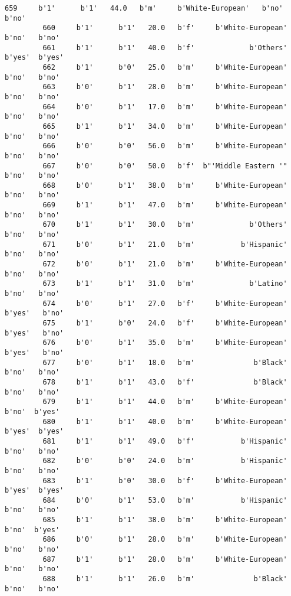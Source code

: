 \documentclass[11pt]{article}
\begin{document}
\begin{Verbatim}[commandchars=\\\{\}]
         659     b'1'      b'1'   44.0   b'm'     b'White-European'   b'no'   b'no'   
         660     b'1'      b'1'   20.0   b'f'     b'White-European'   b'no'   b'no'   
         661     b'1'      b'1'   40.0   b'f'             b'Others'  b'yes'  b'yes'   
         662     b'1'      b'0'   25.0   b'm'     b'White-European'   b'no'   b'no'   
         663     b'0'      b'1'   28.0   b'm'     b'White-European'   b'no'   b'no'   
         664     b'0'      b'1'   17.0   b'm'     b'White-European'   b'no'   b'no'   
         665     b'1'      b'1'   34.0   b'm'     b'White-European'   b'no'   b'no'   
         666     b'0'      b'0'   56.0   b'm'     b'White-European'   b'no'   b'no'   
         667     b'0'      b'0'   50.0   b'f'  b"'Middle Eastern '"   b'no'   b'no'   
         668     b'0'      b'1'   38.0   b'm'     b'White-European'   b'no'   b'no'   
         669     b'1'      b'1'   47.0   b'm'     b'White-European'   b'no'   b'no'   
         670     b'1'      b'1'   30.0   b'm'             b'Others'   b'no'   b'no'   
         671     b'0'      b'1'   21.0   b'm'           b'Hispanic'   b'no'   b'no'   
         672     b'0'      b'1'   21.0   b'm'     b'White-European'   b'no'   b'no'   
         673     b'1'      b'1'   31.0   b'm'             b'Latino'   b'no'   b'no'   
         674     b'0'      b'1'   27.0   b'f'     b'White-European'  b'yes'   b'no'   
         675     b'1'      b'0'   24.0   b'f'     b'White-European'  b'yes'   b'no'   
         676     b'0'      b'1'   35.0   b'm'     b'White-European'  b'yes'   b'no'   
         677     b'0'      b'1'   18.0   b'm'              b'Black'   b'no'   b'no'   
         678     b'1'      b'1'   43.0   b'f'              b'Black'   b'no'   b'no'   
         679     b'1'      b'1'   44.0   b'm'     b'White-European'   b'no'  b'yes'   
         680     b'1'      b'1'   40.0   b'm'     b'White-European'  b'yes'  b'yes'   
         681     b'1'      b'1'   49.0   b'f'           b'Hispanic'   b'no'   b'no'   
         682     b'0'      b'0'   24.0   b'm'           b'Hispanic'   b'no'   b'no'   
         683     b'1'      b'0'   30.0   b'f'     b'White-European'  b'yes'  b'yes'   
         684     b'0'      b'1'   53.0   b'm'           b'Hispanic'   b'no'   b'no'   
         685     b'1'      b'1'   38.0   b'm'     b'White-European'   b'no'  b'yes'   
         686     b'0'      b'1'   28.0   b'm'     b'White-European'   b'no'   b'no'   
         687     b'1'      b'1'   28.0   b'm'     b'White-European'   b'no'   b'no'   
         688     b'1'      b'1'   26.0   b'm'              b'Black'   b'no'   b'no'   

\end{Verbatim}
\end{document}

